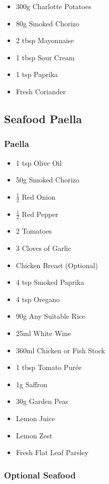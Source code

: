 \documentclass[11pt, english]{article}
\begin{document}
	\begin{itemize}
        \setlength\itemsep{0cm}
                \item 300g Charlotte Potatoes
		\item 80g Smoked Chorizo
		\item 2 tbsp Mayonnaise
		\item 1 tbsp Sour Cream
		\item 1 tsp Paprika
		\item Fresh Coriander
        \end{itemize}

\newpage

	\subsection{Seafood Paella}

		\subsubsection*{Paella}

	\begin{itemize}
        \setlength\itemsep{0cm}
                \item 1 tsp Olive Oil
		\item 50g Smoked Chorizo
		\item $\frac{1}{2}$ Red Onion
		\item $\frac{1}{2}$ Red Pepper
		\item 2 Tomatoes
		\item 3 Cloves of Garlic
		\item Chicken Breast (Optional)
		\item 4 tsp Smoked Paprika
		\item 4 tsp Oregano
		\item 90g Any Suitable Rice
		\item 25ml White Wine
		\item 360ml Chicken or Fish Stock
		\item 1 tbsp Tomato Pur\'{e}e
		\item 1g Saffron
		\item 30g Garden Peas
		\item Lemon Juice
		\item Lemon Zest
		\item Fresh Flat Leaf Parsley
        \end{itemize}

		\subsubsection*{Optional Seafood}
\end{document}
